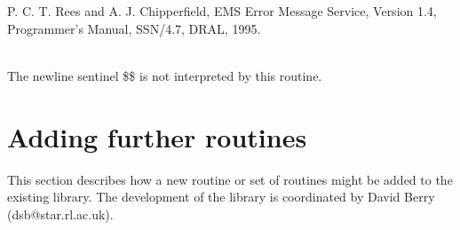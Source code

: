 \documentclass[11pt,twoside]{article}
\newcommand{\xlabel}[1]{}
\newcommand{\sstimplementationstatus}[1]{
   \item[{Implementation Status:}] \mbox{} \\[1.3ex] #1}
\newcommand{\sstimplementationstatus}[1]{
      \item[Implementation Status:] #1
   }
\begin{document}
{{         P. C. T. Rees and A. J. Chipperfield, EMS Error Message Service,
            Version 1.4, Programmer's Manual,
            SSN/4.7, DRAL, 1995.
   }
   \sstimplementationstatus{
      The newline sentinel \$\$ is not interpreted by this routine.
   }
}


\section{\xlabel{adding_further_routines}Adding further routines}

   This section describes how a new routine or set of routines might be
   added to the existing library.
   The development of the library is coordinated by David Berry
   (dsb@star.rl.ac.uk).
\end{document}
